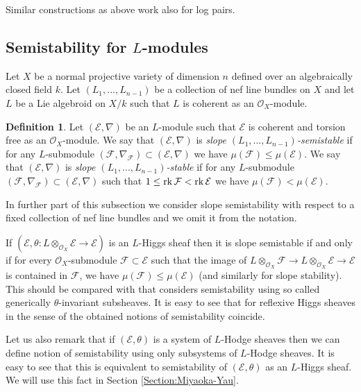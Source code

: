 \documentclass[12pt]{article}
\theoremstyle{plain}
\theoremstyle{definition}
\newtheorem{Definition}[Thm]{Definition}
\theoremstyle{remark}
\newcommand{\cE}{{\mathcal E}}
\newcommand{\cF}{{\mathcal F}}
\newcommand{\cO}{{\mathcal O}}
\newcommand{\rk}{{\mathop{\rm rk \,}}}
\begin{document}
\medskip

Similar constructions as above work also for log pairs.


\subsection{Semistability for $L$-modules}

Let $X$ be a normal projective variety of dimension $n$ defined over an algebraically closed field $k$.
Let $(L_1,...,L_{n-1})$ be a collection of nef line bundles on $X$ and let $L$ be a Lie algebroid on $X/k$ such that $L$ is coherent as an $\cO_X$-module.

\begin{Definition}
	Let $(\cE, \nabla)$ be an $L$-module such that $\cE$ is coherent and torsion free as an $\cO_X$-module. We say that $(\cE, \nabla)$ is \emph{slope  $(L_1,...,L_{n-1})$-semistable} 
	if for any $L$-submodule  $(\cF, \nabla _{\cF})\subset (\cE, \nabla)$ we have
	$\mu (\cF)\le \mu (\cE)$. We say that  $(\cE, \nabla)$ is \emph{slope  $(L_1,...,L_{n-1})$-stable} 
	if for any $L$-submodule  $(\cF, \nabla _{\cF})\subset (\cE, \nabla)$ such that $1\le \rk \cF<\rk\cE$ we have	$\mu (\cF)< \mu (\cE)$. 
\end{Definition}


 In further part of this subsection we consider slope semistability with respect to a fixed collection of nef line bundles and we omit it from the notation.
 
If $(\cE, \theta: L\otimes _{\cO_X}\cE \to \cE )$ is an $L$-Higgs sheaf then it is slope semistable
if and only if for every $\cO_X$-submodule $\cF\subset \cE$ such that the image of 
$L\otimes  _{\cO_X}\cF \to L\otimes _{\cO_X}\cE \to \cE$ is contained in $\cF$, we have 
$\mu (\cF)\le \mu (\cE)$ (and similarly for slope stability).
This should be compared with \cite[Definition 4.13]{GKPT2} that considers semistability using 
so called generically $\theta$-invariant subsheaves. It is easy to see that for reflexive Higgs sheaves in the sense of \cite{GKPT2} the obtained notions of semistability coincide.

Let us also remark that if $(\cE, \theta)$ is a system of $L$-Hodge sheaves then we can define notion of semistability using only subsystems of $L$-Hodge sheaves. It is easy to see that this is equivalent to semistability of $(\cE, \theta)$ as an $L$-Higgs sheaf. We will use this fact in Section \ref{Section:Miyaoka-Yau}.


\medskip
\end{document}
